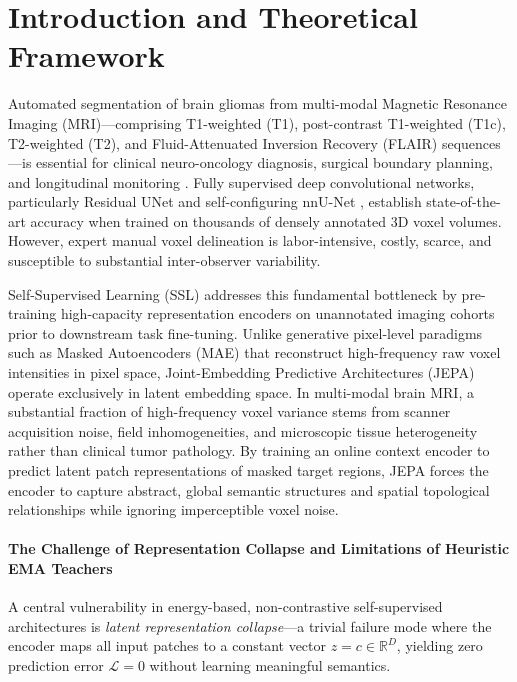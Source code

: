 \documentclass{article}
\begin{document}
\section{Introduction and Theoretical Framework}

Automated segmentation of brain gliomas from multi-modal Magnetic Resonance Imaging (MRI)---comprising T1-weighted (T1), post-contrast T1-weighted (T1c), T2-weighted (T2), and Fluid-Attenuated Inversion Recovery (FLAIR) sequences---is essential for clinical neuro-oncology diagnosis, surgical boundary planning, and longitudinal monitoring \citep{brats2024}. Fully supervised deep convolutional networks, particularly Residual UNet \citep{ronneberger2015u} and self-configuring nnU-Net \citep{isensee2021nnunet}, establish state-of-the-art accuracy when trained on thousands of densely annotated 3D voxel volumes. However, expert manual voxel delineation is labor-intensive, costly, scarce, and susceptible to substantial inter-observer variability.

Self-Supervised Learning (SSL) addresses this fundamental bottleneck by pre-training high-capacity representation encoders on unannotated imaging cohorts prior to downstream task fine-tuning. Unlike generative pixel-level paradigms such as Masked Autoencoders (MAE) \citep{he2022masked} that reconstruct high-frequency raw voxel intensities in pixel space, Joint-Embedding Predictive Architectures (JEPA) \citep{assran2023ijepa} operate exclusively in latent embedding space. In multi-modal brain MRI, a substantial fraction of high-frequency voxel variance stems from scanner acquisition noise, field inhomogeneities, and microscopic tissue heterogeneity rather than clinical tumor pathology. By training an online context encoder to predict latent patch representations of masked target regions, JEPA forces the encoder to capture abstract, global semantic structures and spatial topological relationships while ignoring imperceptible voxel noise.

\paragraph{The Challenge of Representation Collapse and Limitations of Heuristic EMA Teachers}
A central vulnerability in energy-based, non-contrastive self-supervised architectures is \emph{latent representation collapse}---a trivial failure mode where the encoder maps all input patches to a constant vector $z = c \in \mathbb{R}^D$, yielding zero prediction error $\mathcal{L} = 0$ without learning meaningful semantics. 
\end{document}

